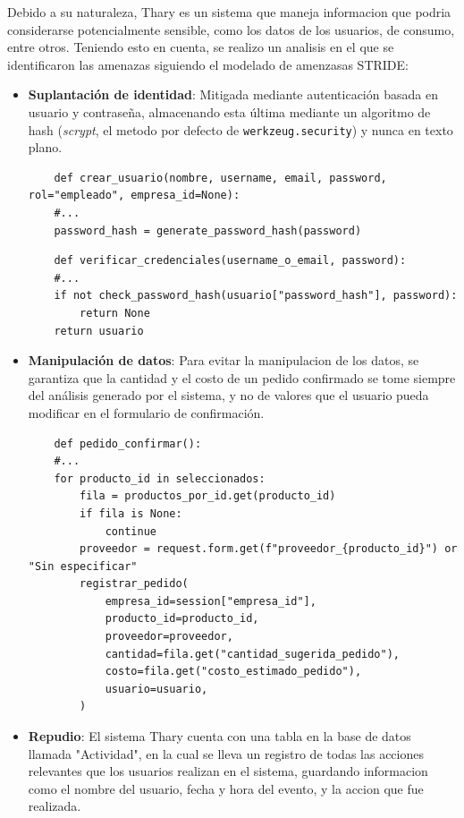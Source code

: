 Debido a su naturaleza, Thary es un sistema que maneja informacion que podria considerarse potencialmente sensible, como los datos de los usuarios, de consumo, entre otros. Teniendo esto en cuenta, se realizo un analisis en el que se identificaron las amenazas siguiendo el modelado de amenzasas STRIDE:

\begin{itemize}
    \item \textbf{Suplantación de identidad}: Mitigada mediante autenticación basada en usuario y contraseña, almacenando esta última mediante un algoritmo de hash (\textit{scrypt}, el metodo por defecto de \texttt{werkzeug.security}) y nunca en texto plano.
    
    \begin{verbatim}
    def crear_usuario(nombre, username, email, password, rol="empleado", empresa_id=None):
    #...
    password_hash = generate_password_hash(password)
    \end{verbatim}

    \begin{verbatim}
    def verificar_credenciales(username_o_email, password):
    #...
    if not check_password_hash(usuario["password_hash"], password):
        return None
    return usuario
    \end{verbatim}

    \item \textbf{Manipulación de datos}: Para evitar la manipulacion de los datos, se garantiza que la cantidad y el costo de un pedido confirmado se tome siempre del análisis generado por el sistema, y no de valores que el usuario pueda modificar en el formulario de confirmación.
    
    \begin{verbatim}
    def pedido_confirmar():
    #...
    for producto_id in seleccionados:
        fila = productos_por_id.get(producto_id)
        if fila is None:
            continue
        proveedor = request.form.get(f"proveedor_{producto_id}") or "Sin especificar"
        registrar_pedido(
            empresa_id=session["empresa_id"],
            producto_id=producto_id,
            proveedor=proveedor,
            cantidad=fila.get("cantidad_sugerida_pedido"),
            costo=fila.get("costo_estimado_pedido"),
            usuario=usuario,
        )
    \end{verbatim}

    \item \textbf{Repudio}: El sistema Thary cuenta con una tabla en la base de datos llamada "Actividad", en la cual se lleva un registro de todas las acciones relevantes que los usuarios realizan en el sistema, guardando informacion como el nombre del usuario, fecha y hora del evento, y la accion que fue realizada.
    

\end{itemize}
